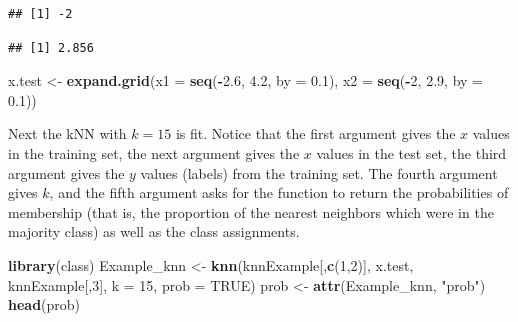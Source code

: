 \documentclass[
]{krantz}
\newenvironment{Shaded}{\begin{snugshade}}{\end{snugshade}}
\newcommand{\DataTypeTok}[1]{\textcolor[rgb]{0.13,0.29,0.53}{#1}}
\newcommand{\DecValTok}[1]{\textcolor[rgb]{0.00,0.00,0.81}{#1}}
\newcommand{\FloatTok}[1]{\textcolor[rgb]{0.00,0.00,0.81}{#1}}
\newcommand{\KeywordTok}[1]{\textcolor[rgb]{0.13,0.29,0.53}{\textbf{#1}}}
\newcommand{\NormalTok}[1]{#1}
\newcommand{\OperatorTok}[1]{\textcolor[rgb]{0.81,0.36,0.00}{\textbf{#1}}}
\newcommand{\OtherTok}[1]{\textcolor[rgb]{0.56,0.35,0.01}{#1}}
\newcommand{\StringTok}[1]{\textcolor[rgb]{0.31,0.60,0.02}{#1}}
\begin{document}
\begin{verbatim}
## [1] -2
\end{verbatim}

\begin{Shaded}
\end{Shaded}

\begin{verbatim}
## [1] 2.856
\end{verbatim}

\begin{Shaded}
\begin{Highlighting}[]
\NormalTok{x.test \textless{}{-}}\StringTok{ }\KeywordTok{expand.grid}\NormalTok{(}\DataTypeTok{x1 =} \KeywordTok{seq}\NormalTok{(}\OperatorTok{{-}}\FloatTok{2.6}\NormalTok{, }\FloatTok{4.2}\NormalTok{, }\DataTypeTok{by =} \FloatTok{0.1}\NormalTok{), }
              \DataTypeTok{x2 =} \KeywordTok{seq}\NormalTok{(}\OperatorTok{{-}}\DecValTok{2}\NormalTok{, }\FloatTok{2.9}\NormalTok{, }\DataTypeTok{by =} \FloatTok{0.1}\NormalTok{))}
\end{Highlighting}
\end{Shaded}

Next the kNN with \(k=15\) is fit. Notice that the first argument gives the \(x\) values in the training set, the next argument gives the \(x\) values in the test set, the third argument gives the \(y\) values (labels) from the training set. The fourth argument gives \(k\), and the fifth argument asks for the function to return the probabilities of membership (that is, the proportion of the nearest neighbors which were in the majority class) as well as the class assignments.

\begin{Shaded}
\begin{Highlighting}[]
\KeywordTok{library}\NormalTok{(class)}
\NormalTok{Example\_knn \textless{}{-}}\StringTok{ }\KeywordTok{knn}\NormalTok{(knnExample[,}\KeywordTok{c}\NormalTok{(}\DecValTok{1}\NormalTok{,}\DecValTok{2}\NormalTok{)], x.test, knnExample[,}\DecValTok{3}\NormalTok{], }
           \DataTypeTok{k =} \DecValTok{15}\NormalTok{, }\DataTypeTok{prob =} \OtherTok{TRUE}\NormalTok{)}
\NormalTok{prob \textless{}{-}}\StringTok{ }\KeywordTok{attr}\NormalTok{(Example\_knn, }\StringTok{"prob"}\NormalTok{)}
\KeywordTok{head}\NormalTok{(prob)}
\end{Highlighting}
\end{Shaded}
\end{document}
